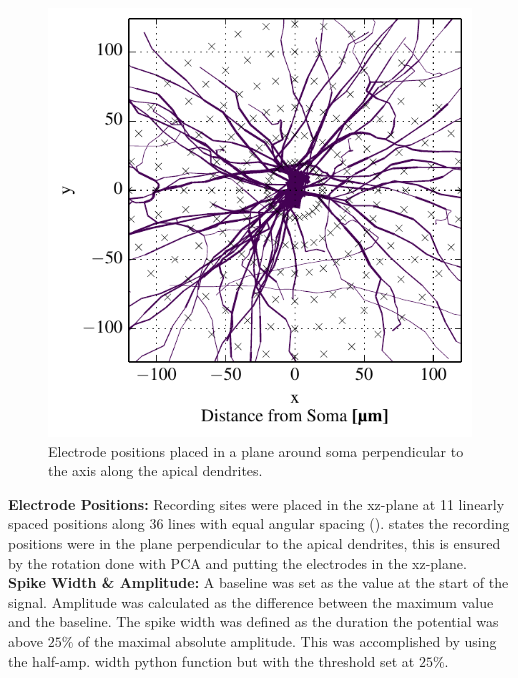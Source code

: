 \documentclass[altfont, fleqn]{uiophd}
\renewcommand{\cref}[1]{{\color{viridis_03}\mycref{#1}}}
\begin{document}
\begin{figure}
    \vspace{-20pt}
    \begin{center}
        \includegraphics[width=\linewidth]{images/4_1/disc_morph_elec_xz.pdf}
        \vspace{-20pt}
        \caption{%
            Electrode positions placed in a plane around soma perpendicular to
            the axis along the apical dendrites.
            }
        \label{fig:4_1_electrode_pos}
        \vspace{-10pt}
    \end{center}
\end{figure}
\noindent
\textbf{Electrode Positions:}
Recording sites were placed in the xz-plane at 11 linearly spaced 
positions along 36 lines with equal 
angular spacing (\cref{fig:4_1_electrode_pos}).
\textcite{pettersen_amplitude_2008} states the recording positions
were in the plane perpendicular to the apical dendrites, this is 
ensured by the rotation done with PCA and putting the electrodes in
the xz-plane.
\\


\noindent
\textbf{Spike Width \& Amplitude:}
A baseline was set as the value at the start of the signal. 
Amplitude was calculated as the difference between the maximum value and the
baseline.
The spike width was defined as the duration the potential was above
$25\%$ of the maximal absolute amplitude. 
This was accomplished by using the half-amp. width
python function but with the threshold set at $25 \%$. 
\end{document}
